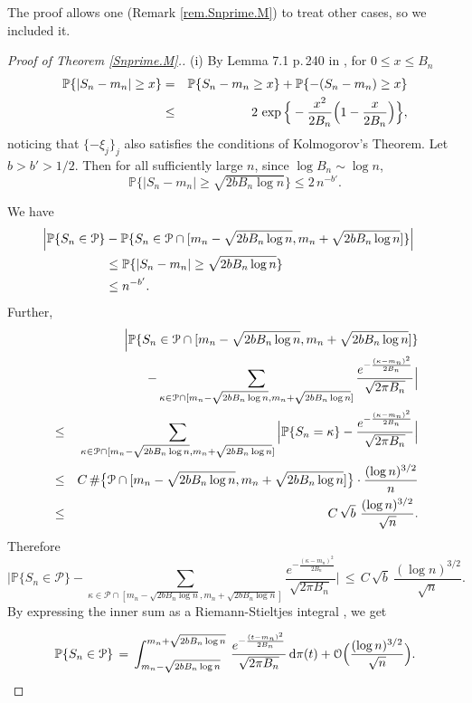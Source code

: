 \documentclass[11pt,draft,reqno]{amsart}
\theoremstyle{definition}
\theoremstyle{remarks}
\numberwithin{equation}{section}
\def \k{{\kappa}}
\def \dd{{\rm d}}
\def\P{{\mathcal P}}
\def\P{{\mathbb P}}
\begin{document}
The proof  allows one (Remark \ref{rem.Snprime.M}) to treat other cases, so we   included it. \begin{proof}[Proof of Theorem \ref{Snprime.M}.]
(i) By Lemma 7.1 p.\,240 in \cite{P}, for $0\le x\le B_n$
\begin{eqnarray*} \P \{|S_n-m_n|\ge x \}&=& \P \{S_n-m_n\ge x \}
+\P \{-(S_n-m_n)\ge x \}
\cr &\le &2\,\exp\Big\{-\frac{x^2}{2B_n}\Big(1-\frac{x}{2B_n}\Big)\Big\},
\end{eqnarray*}
noticing that   $\{-\xi_j\}_j$ also satisfies the conditions of Kolmogorov's Theorem. Let $b>b'>1/2$.
Then for all sufficiently large $n$, since $\log  B_n\sim \log n$,
\begin{equation} \P \{|S_n-m_n|\ge  \sqrt{2bB_n\log   n} \}\le
2\,  n^{-b'}
.
\end{equation}

 We have \begin{align*}   \Big|  \P \{S_n \in\mathcal P \}&  -  \P \{S_n \in \mathcal P\cap[m_n- \sqrt{ 2bB_n\log n},m_n+\sqrt{ 2bB_n\log n}] \} \Big| 
\cr &\le    \P \{|S_n-m_n|\ge \sqrt{ 2bB_n\log n} \}
\cr &\le   n^{-b'}.
   \end{align*}
Further,
\begin{eqnarray*}& & \Big|  \P \{S_n \in \mathcal P\cap[m_n-\sqrt{ 2bB_n\log n},m_n+\sqrt{ 2bB_n\log n}] \}
\cr & &-\sum_{\k\in\mathcal P\cap[m_n-\sqrt{ 2bB_n\log n},m_n+\sqrt{ 2bB_n\log n}]} \frac{ e^{- \frac{(\k- m_n)^2}{    2  B_n   } } }{ \sqrt{2\pi  B_n  } } 
\Big|
 \cr &\le & \sum_{\k\in\mathcal P\cap[m_n-\sqrt{ 2bB_n\log n},m_n+\sqrt{ 2bB_n\log n}]}\Big|\P \{S_n =\kappa \} -\frac{ e^{- \frac{(\k- m_n)^2}{    2  B_n   } } }{ \sqrt{2\pi B_n   } }     \Big|   
  \cr     & \le &    C\,\#\big\{\mathcal P\cap[m_n-\sqrt{ 2bB_n\log n},m_n+\sqrt{ 2bB_n\log n}] \big\}\cdot
 \frac{(\log n)^{3/2}}{n} 
  \cr     & \le & 
  C\, \sqrt b\ \frac{(\log n)^{3/2 }}{\sqrt n} 
.
  \end{eqnarray*}
Therefore
\begin{equation} \label{3} \Big|  \P \{S_n \in \mathcal P  \}
 -\sum_{\k\in\mathcal P\cap[m_n-\sqrt{ 2bB_n\log n},m_n+\sqrt{ 2bB_n\log n}]} \frac{ e^{- \frac{(\k- m_n)^2}{    2  B_n   } } }{ \sqrt{2\pi  B_n  } } 
\Big|
     \, \le \, 
   C\,\sqrt b\  \frac{(\log n)^{3/2 }}{\sqrt n} 
.
  \end{equation}
 By    expressing the inner sum as a Riemann-Stieltjes integral  \cite[p.\,77]{A}, we get

\begin{equation}\label{abel.base}   \P \{S_n \in \mathcal P  \}
\, =\, \int_{m_n-\sqrt{ 2bB_n\log n}}^{m_n+\sqrt{ 2bB_n\log n}}
  \,\frac{ e^{- \frac{(t- m_n)^2}{    2  B_n   } } }{ \sqrt{2\pi  B_n  } }\, \dd \pi(t)
    + \mathcal O\Big( \frac{(\log n)^{3/2 }}{\sqrt n} \Big)
.
  \end{equation}


\end{proof}
\end{document}
